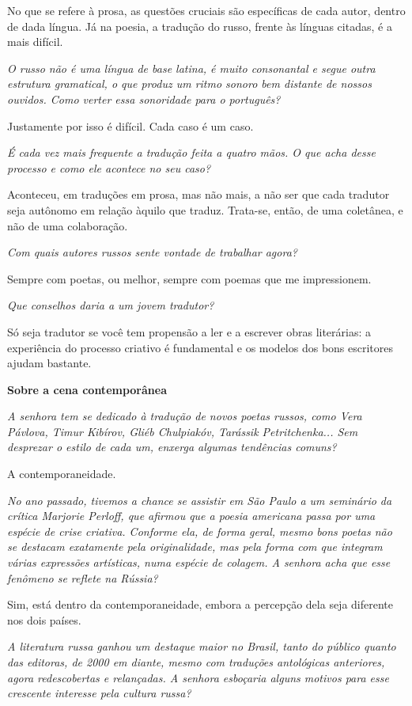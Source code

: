 No que se refere à prosa, as questões cruciais são específicas de cada
autor, dentro de dada língua. Já na poesia, a tradução do russo, frente
às línguas citadas, é a mais difícil.

\emph{O russo não é uma língua de base latina, é muito consonantal e
segue outra estrutura gramatical, o que produz um ritmo sonoro bem
distante de nossos ouvidos. Como verter essa sonoridade para o
português?}

Justamente por isso é difícil. Cada caso é um caso.

\emph{É cada vez mais frequente a tradução feita a quatro mãos. O que
acha desse processo e como ele acontece no seu caso?}

Aconteceu, em traduções em prosa, mas não mais, a não ser que cada
tradutor seja autônomo em relação àquilo que traduz. Trata-se, então, de
uma coletânea, e não de uma colaboração.

\emph{Com quais autores russos sente vontade de trabalhar agora?}

Sempre com poetas, ou melhor, sempre com poemas que me impressionem.

\emph{Que conselhos daria a um jovem tradutor?}

Só seja tradutor se você tem propensão a ler e a escrever obras
literárias: a experiência do processo criativo é fundamental e os
modelos dos bons escritores ajudam bastante.

\textbf{Sobre a cena contemporânea}

\emph{A senhora tem se dedicado à tradução de novos poetas russos, como
Vera Pávlova, Timur Kibírov, Gliéb Chulpiakóv, Tarássik Petritchenka...
Sem desprezar o estilo de cada um, enxerga algumas tendências comuns?}

A contemporaneidade.

\emph{No ano passado, tivemos a chance se assistir em São Paulo a um
seminário da crítica Marjorie Perloff, que afirmou que a poesia
americana passa por uma espécie de crise criativa. Conforme ela, de
forma geral, mesmo bons poetas não se destacam exatamente pela
originalidade, mas pela forma com que integram várias expressões
artísticas, numa espécie de colagem. A senhora acha que esse fenômeno se
reflete na Rússia?}

Sim, está dentro da contemporaneidade, embora a percepção dela seja
diferente nos dois países.

\emph{A literatura russa ganhou um destaque maior no Brasil, tanto do
público quanto das editoras, de 2000 em diante, mesmo com traduções
antológicas anteriores, agora redescobertas e relançadas. A senhora
esboçaria alguns motivos para esse crescente interesse pela cultura
russa?}

